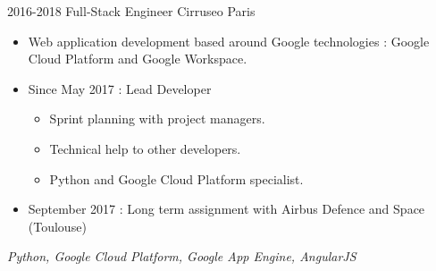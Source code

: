 \cventry
    {2016-2018}
    {Full-Stack Engineer}
    {}
    {Cirruseo}
    {Paris}
    {
        \begin{itemize}
            \item Web application development based around Google technologies : Google Cloud Platform and Google Workspace.
            \item Since May 2017 : Lead Developer
            \begin{itemize}
                \item Sprint planning with project managers.
                \item Technical help to other developers.
                \item Python and Google Cloud Platform specialist.
            \end{itemize}
            \item September 2017 : Long term assignment with Airbus Defence and Space (Toulouse)
        \end{itemize}
        \textit{Python, Google Cloud Platform, Google App Engine, AngularJS}
    }
\vspace*{0.2cm}
